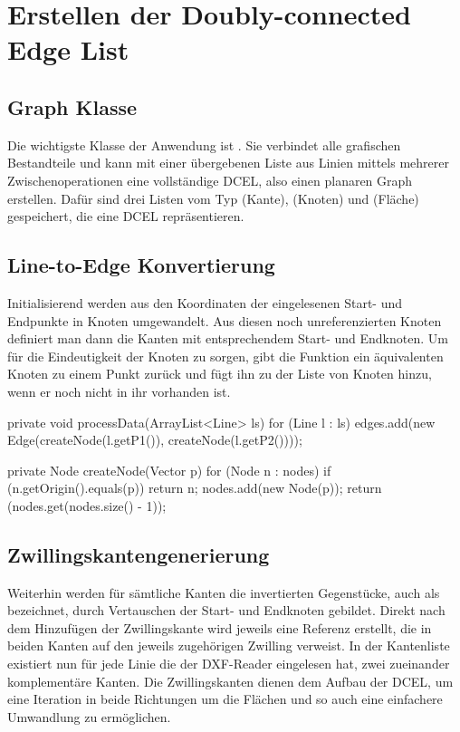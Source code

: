 \section{Erstellen der Doubly-connected Edge List}
\subsection{Graph Klasse}
Die wichtigste Klasse der Anwendung ist . 
Sie verbindet alle grafischen Bestandteile und kann mit einer übergebenen Liste aus Linien mittels mehrerer Zwischenoperationen eine vollständige DCEL, also einen planaren Graph erstellen.
Dafür sind drei Listen vom Typ (Kante), (Knoten) und (Fläche) gespeichert, die eine DCEL repräsentieren.
\subsection{Line-to-Edge Konvertierung}
\label{subsec:ltoe} 
Initialisierend werden aus den Koordinaten der eingelesenen Start- und Endpunkte in Knoten umgewandelt.
Aus diesen noch unreferenzierten Knoten definiert man dann die Kanten mit entsprechendem Start- und Endknoten.
Um für die Eindeutigkeit der Knoten zu sorgen, gibt die Funktion  ein äquivalenten Knoten zu einem Punkt zurück und fügt ihn zu der Liste von Knoten hinzu, wenn er noch nicht in ihr vorhanden ist.

\begin{code}
private void processData(ArrayList<Line> ls) {
	for (Line l : ls) {
		edges.add(new Edge(createNode(l.getP1()), createNode(l.getP2())));
	}
}
\end{code}

\begin{code}
private Node createNode(Vector p) {
	for (Node n : nodes) {
		if (n.getOrigin().equals(p)) {
			return n;
		}
	}
	nodes.add(new Node(p));
	return (nodes.get(nodes.size() - 1));
}
\end{code}


\subsection{Zwillingskantengenerierung}
Weiterhin werden für sämtliche Kanten die invertierten Gegenstücke, auch als  bezeichnet, durch Vertauschen der Start- und Endknoten gebildet.
Direkt nach dem Hinzufügen der Zwillingskante wird jeweils eine Referenz erstellt, die in beiden Kanten auf den jeweils zugehörigen Zwilling verweist. 
In der Kantenliste existiert nun für jede Linie die der DXF-Reader eingelesen hat, zwei zueinander komplementäre Kanten.
Die Zwillingskanten dienen dem Aufbau der DCEL, um eine Iteration in beide Richtungen um die Flächen und so auch eine einfachere Umwandlung zu ermöglichen.

